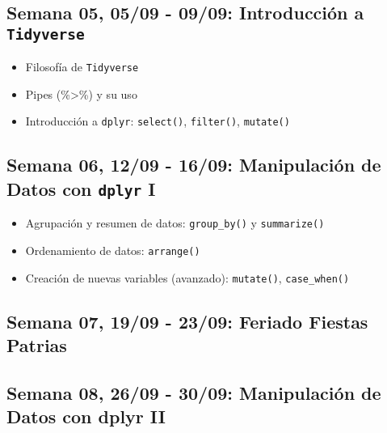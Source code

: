\documentclass[11pt,letter,]{article}
\providecommand{\tightlist}{%
  \setlength{\itemsep}{0pt}\setlength{\parskip}{0pt}}
\begin{document}
\hypertarget{semana-05-0509---0909-introducciuxf3n-a-tidyverse}{%
\subsection{\texorpdfstring{Semana 05, 05/09 - 09/09: Introducción a
\texttt{Tidyverse}}{Semana 05, 05/09 - 09/09: Introducción a Tidyverse}}\label{semana-05-0509---0909-introducciuxf3n-a-tidyverse}}

\begin{itemize}
\tightlist
\item
  Filosofía de \texttt{Tidyverse}
\item
  Pipes (\%\textgreater\%) y su uso
\item
  Introducción a \texttt{dplyr}: \texttt{select()}, \texttt{filter()},
  \texttt{mutate()}
\end{itemize}

\hypertarget{semana-06-1209---1609-manipulaciuxf3n-de-datos-con-dplyr-i}{%
\subsection{\texorpdfstring{Semana 06, 12/09 - 16/09: Manipulación de
Datos con \texttt{dplyr}
I}{Semana 06, 12/09 - 16/09: Manipulación de Datos con dplyr I}}\label{semana-06-1209---1609-manipulaciuxf3n-de-datos-con-dplyr-i}}

\begin{itemize}
\tightlist
\item
  Agrupación y resumen de datos: \texttt{group\_by()} y
  \texttt{summarize()}
\item
  Ordenamiento de datos: \texttt{arrange()}
\item
  Creación de nuevas variables (avanzado): \texttt{mutate()},
  \texttt{case\_when()}
\end{itemize}

\hypertarget{semana-07-1909---2309-feriado-fiestas-patrias}{%
\subsection{Semana 07, 19/09 - 23/09: Feriado Fiestas
Patrias}\label{semana-07-1909---2309-feriado-fiestas-patrias}}

\hypertarget{semana-08-2609---3009-manipulaciuxf3n-de-datos-con-dplyr-ii}{%
\subsection{Semana 08, 26/09 - 30/09: Manipulación de Datos con dplyr
II}\label{semana-08-2609---3009-manipulaciuxf3n-de-datos-con-dplyr-ii}}
\end{document}

